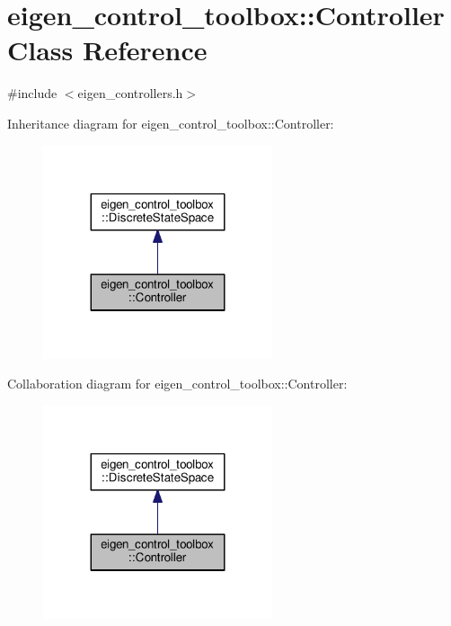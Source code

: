 \hypertarget{classeigen__control__toolbox_1_1_controller}{}\section{eigen\+\_\+control\+\_\+toolbox\+:\+:Controller Class Reference}
\label{classeigen__control__toolbox_1_1_controller}


{\ttfamily \#include $<$eigen\+\_\+controllers.\+h$>$}



Inheritance diagram for eigen\+\_\+control\+\_\+toolbox\+:\+:Controller\+:
\nopagebreak
\begin{figure}[H]
\begin{center}
\leavevmode
\includegraphics[width=191pt]{classeigen__control__toolbox_1_1_controller__inherit__graph}
\end{center}
\end{figure}


Collaboration diagram for eigen\+\_\+control\+\_\+toolbox\+:\+:Controller\+:
\nopagebreak
\begin{figure}[H]
\begin{center}
\leavevmode
\includegraphics[width=191pt]{classeigen__control__toolbox_1_1_controller__coll__graph}
\end{center}
\end{figure}

